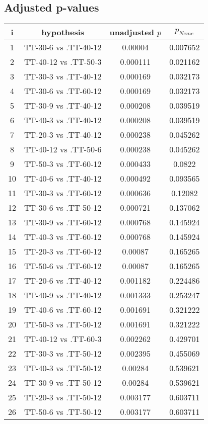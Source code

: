 \documentclass[a4paper,10pt]{article}
\begin{document}
\begin{landscape}
\pagebreak

\subsection{Adjusted p-values}

\begin{table}[!htp]
\centering\scriptsize
\begin{tabular}{cccc}
i&hypothesis&unadjusted $p$&$p_{Neme}$\\
\hline1&TT-30-6 vs .TT-40-12&0.00004&0.007652\\
2&TT-40-12 vs .TT-50-3&0.000111&0.021162\\
3&TT-30-3 vs .TT-40-12&0.000169&0.032173\\
4&TT-30-6 vs .TT-60-12&0.000169&0.032173\\
5&TT-30-9 vs .TT-40-12&0.000208&0.039519\\
6&TT-40-3 vs .TT-40-12&0.000208&0.039519\\
7&TT-20-3 vs .TT-40-12&0.000238&0.045262\\
8&TT-40-12 vs .TT-50-6&0.000238&0.045262\\
9&TT-50-3 vs .TT-60-12&0.000433&0.0822\\
10&TT-40-6 vs .TT-40-12&0.000492&0.093565\\
11&TT-30-3 vs .TT-60-12&0.000636&0.12082\\
12&TT-30-6 vs .TT-50-12&0.000721&0.137062\\
13&TT-30-9 vs .TT-60-12&0.000768&0.145924\\
14&TT-40-3 vs .TT-60-12&0.000768&0.145924\\
15&TT-20-3 vs .TT-60-12&0.00087&0.165265\\
16&TT-50-6 vs .TT-60-12&0.00087&0.165265\\
17&TT-20-6 vs .TT-40-12&0.001182&0.224486\\
18&TT-40-9 vs .TT-40-12&0.001333&0.253247\\
19&TT-40-6 vs .TT-60-12&0.001691&0.321222\\
20&TT-50-3 vs .TT-50-12&0.001691&0.321222\\
21&TT-40-12 vs .TT-60-3&0.002262&0.429701\\
22&TT-30-3 vs .TT-50-12&0.002395&0.455069\\
23&TT-40-3 vs .TT-50-12&0.00284&0.539621\\
24&TT-30-9 vs .TT-50-12&0.00284&0.539621\\
25&TT-20-3 vs .TT-50-12&0.003177&0.603711\\
26&TT-50-6 vs .TT-50-12&0.003177&0.603711\\

\end{tabular}
\end{table}
\end{landscape}
\end{document}

